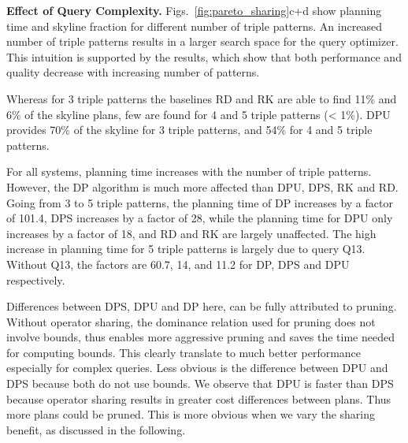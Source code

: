 \textbf{Effect of Query Complexity.} Figs.~\ref{fig:pareto_sharing}c+d show 
planning time and skyline fraction for different number of triple patterns. An increased number of triple
patterns results in a larger search space for the query optimizer. This intuition is supported by the results, which show that both performance and quality decrease with increasing number of patterns. 

Whereas for 3 triple patterns the baselines RD and RK are able to find 11\% and 6\% of the skyline plans, few
are found for 4 and 5 triple patterns (< 1\%). DPU provides 
70\% of the skyline for 3 triple patterns, and 54\% for 4 and 5 triple patterns. 


For all systems, planning time increases with the number of triple
patterns. However, the DP algorithm is much more affected than DPU,
DPS, RK and RD. Going from 3 to 5 triple patterns, the planning time
of DP increases by a factor of 101.4, DPS increases by a factor of 28,
while the planning time for DPU only increases by a factor of 18, and
RD and RK are largely unaffected. The high increase in planning time
for 5 triple patterns is largely due to query Q13. Without Q13, the
factors are 60.7, 14, and 11.2 for DP, DPS and DPU respectively.

Differences between DPS, DPU and DP here, can be fully attributed to pruning. Without operator sharing, the dominance relation used for pruning does not involve bounds, thus enables more aggressive pruning and saves the time needed for computing bounds. This clearly translate to much better performance especially for complex queries. Less obvious is the difference between DPU and DPS because both do not use bounds. We observe that DPU is faster than DPS because operator sharing results in greater cost differences between plans. Thus more plans could be pruned. This is more obvious when we vary the sharing benefit, as discussed in the following.  





